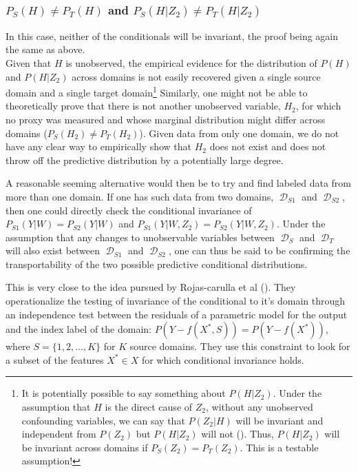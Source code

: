 \documentclass[a4paper,12pt]{article}
\DeclareMathOperator*{\D}{\mathcal{D}}
\begin{document}
\subsubsection*{$P_S(H) \neq P_T(H)$ and $P_S(H|Z_2) \neq P_T(H|Z_2)$}

In this case, neither of the conditionals will be invariant, the proof being again the same as above.
\mbox{}
\\


Given that $H$ is unobserved, the empirical evidence for the distribution of $P(H)$ and $P(H|Z_2)$ across domains is not easily recovered given a single source domain and a single target domain\footnote{It is potentially possible to say something about $P(H|Z_2)$. Under the assumption that $H$ is the direct cause of $Z_2$, without any unobserved confounding variables, we can say that $P(Z_2|H)$ will be invariant and independent from $P(Z_2)$ but $P(H|Z_2)$ will not (\cite[see][for an exposition of this feature which is closely related to weak exogoneity]{Daniusis2010, Sch2012, Peters2017}). Thus, $P(H|Z_2)$ will be invariant across domains if $P_S(Z_2) = P_T(Z_2)$. This is a testable assumption! } Similarly, one might not be able to theoretically prove that there is not another unobserved variable, $H_2$, for which no proxy was measured and whose marginal distribution might differ across domains ($P_S(H_2) \neq P_T(H_2)$). Given data from only one domain, we do not have any clear way to empirically show that $H_2$ does not exist and does not throw off the predictive distribution by a potentially large degree.

A reasonable seeming alternative would then be to try and find labeled data from more than one domain. If one has such data from two domains, $\D_{S1}$ and $\D_{S2}$, then one could directly check the conditional invariance of $P_{S1}(Y|W) = P_{S2}(Y|W)$ and $P_{S1}(Y|W,Z_2) = P_{S2}(Y|W,Z_2)$. Under the assumption that any changes to unobservable variables between $\D_S$  and $\D_T$ will also exist between $\D_{S1}$ and $\D_{S2}$, one can thus be said to be confirming the transportability of the two possible predictive conditional distributions.

This is very close to the idea pursued by Rojas-carulla et al (\cite{Rojas-carulla2018}). They operationalize the testing of invariance of the conditional to it's domain through an independence test between the residuals of a parametric model for the output and the index label of the domain: $P(Y - f(X^*, S)) = P(Y - f(X^*))$, where $S = \{1,2,\ldots,K \}$ for $K$ source domains. They use this constraint to look for a subset of the features $X^* \in X$ for which conditional invariance holds.
\end{document}
